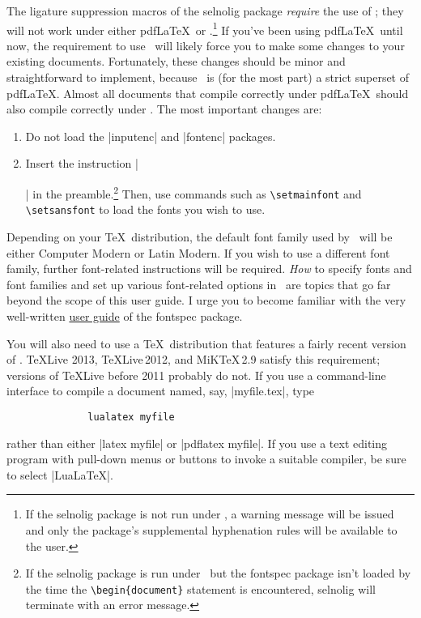 \documentclass[11pt]{article}
\newcommand{\pkg}[1]{\textsf{#1}}
\newcommand{\cmmd}[1]{\texttt{\textbackslash #1}}
\begin{document}
\begingroup
\renewcommand\theenumi{(\roman{enumi})}
\renewcommand\labelenumi\theenumi

The ligature suppression macros of the \pkg{selnolig} package \emph{require} the use of \LuaLaTeX; they will not work under either pdf\LaTeX\ or \XeLaTeX.\footnote{If the \pkg{selnolig} package is not run under \LuaLaTeX, a warning message will be issued and only the package's supplemental hyphenation rules will be available to the user.}
If you've been using pdf\LaTeX\ until now, the requirement to use \LuaLaTeX\ will likely force you to make some changes to your existing documents. Fortunately, these changes should be minor and straightforward to implement, because \LuaLaTeX\ is (for the most part) a strict superset of pdf\LaTeX. Almost all documents that compile correctly under pdf\LaTeX\ should also compile correctly under \LuaLaTeX. The most important changes are: 
\begin{enumerate}
\item Do not load the |inputenc| and |fontenc| packages. \item Insert the instruction |\usepackage{fontspec}|
in the preamble.\footnote{If the \pkg{selnolig} package is run under \LuaLaTeX\ but the \pkg{fontspec} package isn't loaded by the time the \Verb+\begin{document}+ statement is encountered, \pkg{selnolig} will terminate with an error message.} Then, use commands such as \cmmd{setmainfont} and \cmmd{setsansfont} to load the fonts you wish to use.
\end{enumerate}
\endgroup


Depending on your \TeX\ distribution, the default font family used by \LuaLaTeX\ will be either Computer Modern or Latin Modern. If you wish to use a different font family, further font-related instructions will be required. \emph{How} to specify fonts and font families and set up various font-related options in \LuaLaTeX\ are topics that go far beyond the scope of this user guide. I urge you to become familiar with the very well-written
 \href{http://www.ctan.org/tex-archive/macros/latex/contrib/fontspec/fontspec.pdf}{user guide} of the \pkg{fontspec} package.

You will also need to use a \TeX\ distribution that features a fairly recent version of \LuaLaTeX. \TeX Live 2013, \TeX Live\,2012, and MiK\TeX\,2.9 satisfy this requirement; versions of \TeX Live before 2011 probably do not. If you use a command-line interface to compile a document named, say, |myfile.tex|, type 
\begin{Verbatim}
              lualatex myfile
\end{Verbatim}
rather than either |latex myfile| or |pdflatex myfile|. If you use a text editing program with pull-down menus or buttons to invoke a suitable compiler, be sure to select |LuaLaTeX|. 
\end{document}
